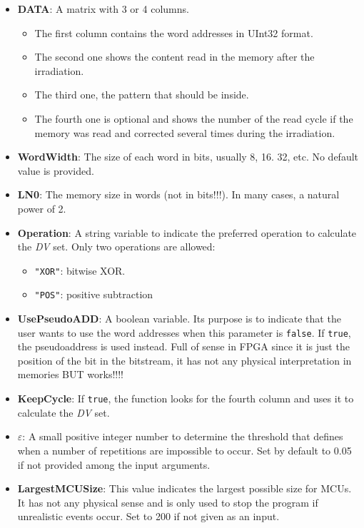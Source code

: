 \begin{itemize}
\begin{itemize}
 		\item   \textbf{DATA}: A matrix with 3 or 4 columns. 
 		\begin{itemize}
 			\item The first column contains the word addresses in UInt32 format.
 			\item The second one shows the content read in the memory after the irradiation.
 			\item The third one, the pattern that should be inside.
 			\item  The fourth one is optional and shows the number of the read cycle if the   memory was read and corrected several times during the irradiation.
 		\end{itemize}
 		\item   \textbf{WordWidth}: The size of each word in bits, usually 8, 16. 32, etc. No default value is provided.
 		\item   \textbf{LN0}: The memory size in words (not in bits!!!). In many cases, a natural power of 2.
 		\item   \textbf{Operation}: A string variable to indicate the preferred operation to calculate
 		the \textit{DV} set. Only two operations are allowed: 
 		\begin{itemize}
 			\item \texttt{"XOR"}: bitwise XOR.
 			\item\texttt{"POS"}: positive subtraction
 		\end{itemize}
 		\item  \textbf{UsePseudoADD}: A boolean variable. Its purpose is to indicate that the user wants to use the word addresses when this parameter is \texttt{false}. If \texttt{true}, the pseudoaddress  is used instead. Full of sense in FPGA since it is just the position  of the bit in the bitstream, it has not any physical interpretation in memories BUT works!!!!
 		\item   \textbf{KeepCycle}: If \texttt{true}, the function looks for the fourth column and uses it to calculate the \textit{DV} set.
 		\item   \textbf{\(\varepsilon\)}: A small positive integer number to determine the threshold that defines when a number of repetitions are impossible to occur. Set by default to 0.05 if not provided among the input arguments.
 		\item  \textbf{LargestMCUSize}: This value indicates the largest possible size for MCUs. It has not any physical sense  and is only used to stop the program if unrealistic events occur. Set to 200 if not given as an input.
 		

\end{itemize}
\end{itemize}
